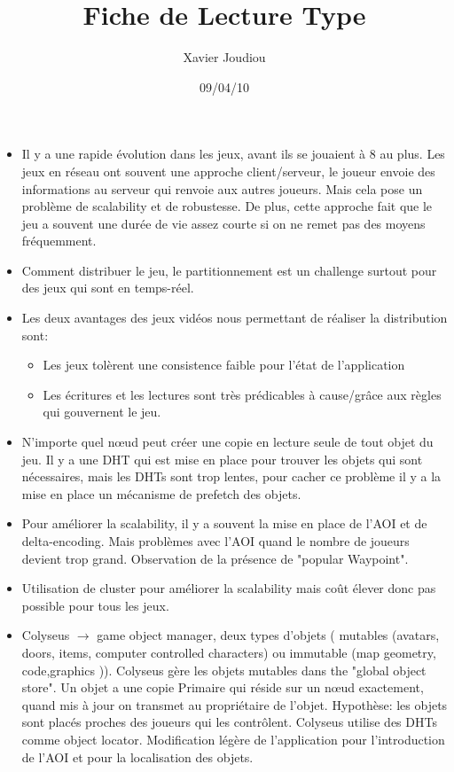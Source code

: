 \documentclass[11pt,a4paper]{article}
\title{Fiche de Lecture Type}
\author{Xavier Joudiou}
\date{09/04/10}
\begin{document}
	
  \begin{itemize}
  \renewcommand{\labelitemi}{$\Rightarrow$}
	\item Il y a une rapide évolution dans les jeux, avant ils se jouaient à 8 au plus. Les jeux en réseau ont souvent une approche client/serveur, le joueur envoie des informations au serveur qui renvoie aux autres joueurs. Mais cela pose un problème de scalability et de robustesse. De plus, cette approche fait que le jeu a souvent une durée de vie assez courte si on ne remet pas des moyens fréquemment.
	\item Comment distribuer le jeu, le partitionnement est un challenge surtout pour des jeux qui sont en temps-réel.
	\item Les deux avantages des jeux vidéos nous permettant de réaliser la distribution sont:
	\begin{itemize}
		\item Les jeux tolèrent une consistence faible pour l'état de l'application
		\item Les écritures et les lectures sont très prédicables à cause/grâce aux règles qui gouvernent le jeu.
	\end{itemize}
	\item N'importe quel nœud peut créer une copie en lecture seule de tout objet du jeu. Il y a une DHT qui est mise en place pour trouver les objets qui sont nécessaires, mais les DHTs sont trop lentes, pour cacher ce problème il y a la mise en place un mécanisme de prefetch des objets. 
	\item Pour améliorer la scalability, il y a souvent la mise en place de l'AOI et de delta-encoding. Mais problèmes avec l'AOI quand le nombre de joueurs devient trop grand. Observation de la présence de "popular Waypoint".
	\item Utilisation de cluster pour améliorer la scalability mais coût élever donc pas possible pour tous les jeux.
	\item Colyseus $\rightarrow$ game object manager, deux types d'objets ( mutables (avatars, doors, items, computer controlled characters) ou immutable (map geometry, code,graphics  )). Colyseus gère les objets mutables dans the "global object store". Un objet a une copie Primaire qui réside sur un nœud exactement, quand mis à jour on transmet au propriétaire de l'objet. Hypothèse: les objets sont placés proches des joueurs qui les contrôlent. Colyseus utilise des DHTs comme object locator. Modification légère de l'application pour l'introduction de l'AOI et pour la localisation des objets.

\end{itemize}
\end{document}
